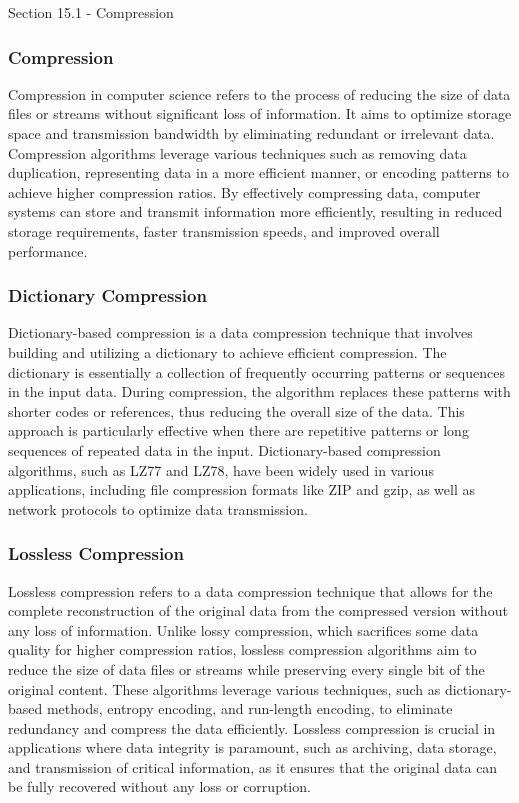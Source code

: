 \begin{notes}{Section 15.1 - Compression}
    \subsubsection{Compression}

    Compression in computer science refers to the process of reducing the size of data files or streams without significant loss of information. It aims to optimize storage space and transmission bandwidth 
    by eliminating redundant or irrelevant data. Compression algorithms leverage various techniques such as removing data duplication, representing data in a more efficient manner, or encoding patterns to 
    achieve higher compression ratios. By effectively compressing data, computer systems can store and transmit information more efficiently, resulting in reduced storage requirements, faster transmission 
    speeds, and improved overall performance.
    
    \subsubsection{Dictionary Compression}
    
    Dictionary-based compression is a data compression technique that involves building and utilizing a dictionary to achieve efficient compression. The dictionary is essentially a collection of frequently 
    occurring patterns or sequences in the input data. During compression, the algorithm replaces these patterns with shorter codes or references, thus reducing the overall size of the data. This approach 
    is particularly effective when there are repetitive patterns or long sequences of repeated data in the input. Dictionary-based compression algorithms, such as LZ77 and LZ78, have been widely used in 
    various applications, including file compression formats like ZIP and gzip, as well as network protocols to optimize data transmission.
    
    \subsubsection{Lossless Compression}
    
    Lossless compression refers to a data compression technique that allows for the complete reconstruction of the original data from the compressed version without any loss of information. Unlike lossy 
    compression, which sacrifices some data quality for higher compression ratios, lossless compression algorithms aim to reduce the size of data files or streams while preserving every single bit of the 
    original content. These algorithms leverage various techniques, such as dictionary-based methods, entropy encoding, and run-length encoding, to eliminate redundancy and compress the data efficiently. 
    Lossless compression is crucial in applications where data integrity is paramount, such as archiving, data storage, and transmission of critical information, as it ensures that the original data can 
    be fully recovered without any loss or corruption.
    

\end{notes}
